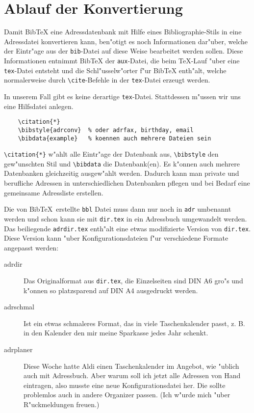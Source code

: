 \documentclass{article}
\newcommand*{\File}[1]{\texttt{#1}}
\newcommand*{\Macro}[1]{\texttt{\textbackslash #1}}
\begin{document}
\section{Ablauf der Konvertierung}

Damit Bib\TeX{} eine Adressdatenbank mit Hilfe eines 
Bibliographie-Stils in eine Adressdatei konvertieren kann, ben"otigt 
es noch Informationen dar"uber, welche der Eintr"age aus der 
\File{bib}-Datei auf diese Weise bearbeitet werden sollen. 
Diese Informationen entnimmt Bib\TeX{} der \File{aux}-Datei, die beim 
\TeX-Lauf "uber eine \File{tex}-Datei entsteht und die 
Schl"usselw"orter f"ur Bib\TeX{} enth"alt, welche normalerweise durch 
\Macro{cite}-Befehle in der \File{tex}-Datei erzeugt werden.

In unserem Fall gibt es keine derartige \File{tex}-Datei.
Stattdessen m"ussen wir uns eine Hilfsdatei anlegen.
\begin{verbatim}
    \citation{*}
    \bibstyle{adrconv}  % oder adrfax, birthday, email
    \bibdata{example}   % koennen auch mehrere Dateien sein
\end{verbatim}

\verb+\citation{*}+ w"ahlt alle Eintr"age der Datenbank aus, 
\verb+\bibstyle+ den gew"unschten Stil und \verb+\bibdata+ die 
Datenbank(en). Es k"onnen auch mehrere Datenbanken gleichzeitig 
ausgew"ahlt werden. Dadurch kann man private und berufliche Adressen 
in unterschiedlichen Datenbanken pflegen und bei Bedarf eine 
gemeinsame Adressliste erstellen.

Die von Bib\TeX\ erstellte \File{bbl} Datei muss dann nur noch in 
\File{adr} umbenannt werden und schon kann sie mit \File{dir.tex} 
in ein Adressbuch umgewandelt werden. Das beiliegende \File{adrdir.tex} 
enth"alt eine etwas modifizierte Version von \File{dir.tex}. Diese 
Version kann "uber Konfigurationsdateien f"ur verschiedene Formate 
angepasst werden:

\begin{description}
    \item[adrdir]  Das Originalformat aus \File{dir.tex}, die 
    Einzelseiten sind DIN A6 gro"s und k"onnen so platzsparend auf DIN 
    A4 ausgedruckt werden.

    \item[adrschmal]  Ist ein etwas schmaleres Format, das in viele 
    Taschenkalender passt, z. B. in den Kalender den mir meine 
    Sparkasse jedes Jahr schenkt.

    \item[adrplaner]  Diese Woche hatte Aldi einen Taschenkalender im 
    Angebot, wie "ublich auch mit Adressbuch. Aber warum soll ich 
    jetzt alle Adressen von Hand eintragen, also musste eine neue 
    Konfigurationsdatei her. Die sollte problemlos auch in andere 
    Organizer passen. (Ich w"urde mich "uber R"uckmeldungen freuen.)
\end{description}
\end{document}

